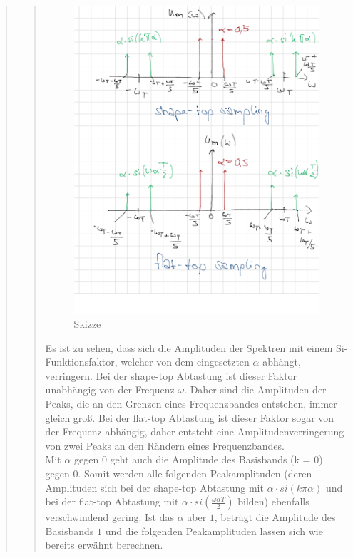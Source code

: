 \begin{quote}
\begin{quote}
         \begin{figure}[H]
            \centering
                \includegraphics[scale=0.3, trim = 0cm 0cm 0cm 0cm,
                clip]{./Bilder/vorbereitungsskizze}
                    \caption{Skizze}
        \end{figure}
        
        Es ist zu sehen, dass sich die Amplituden der Spektren mit einem
        Si-Funktionsfaktor, welcher von dem eingesetzten $\alpha$ abhängt, verringern.
        Bei der shape-top Abtastung ist dieser Faktor unabhängig von der Frequenz
        $\omega$. Daher sind die Amplituden der Peaks, die an den Grenzen eines
        Frequenzbandes entstehen, immer gleich groß.        
        Bei der flat-top Abtastung ist dieser Faktor sogar von der Frequenz abhängig, daher entsteht 
        eine Amplitudenverringerung von zwei Peaks an den Rändern eines
        Frequenzbandes.\\
        Mit $\alpha$ gegen $0$ geht auch die Amplitude des Basisbands (k = $0$) gegen
        $0$. Somit werden alle folgenden Peakamplituden (deren Amplituden sich bei der
        shape-top Abtastung mit $\alpha \cdot si(k \pi \alpha)$ und bei der flat-top
        Abtastung mit $\alpha \cdot si(\frac{\omega \alpha T}{2})$ bilden) ebenfalls
        verschwindend gering. Ist das $\alpha$ aber $1$, beträgt die Amplitude des
        Basisbands $1$ und die folgenden Peakamplituden lassen sich wie bereits
        erwähnt berechnen.
        

\end{quote}
\end{quote}

